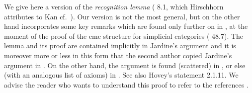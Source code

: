 We give here a version of the {\em recognition lemma}
(\cite{DHK} 8.1, which Hirschhorn attributes to Kan cf.\ \cite{Hirschhorn}). Our
version is not the most general, but on the other hand incorporates some
key remarks which are found only further on in \cite{DHK}, at the
moment of the proof of  the cmc structure for simplicial categories (\cite{DHK}
48.7). The lemma and its proof are contained implicitly
in Jardine's argument \cite{Jardine} and it is moreover
more or less in this form that the second author copied
Jardine's argument in \cite{nCAT}. On the other hand, the argument is found
(scattered) in \cite{JardineGoerssBook}, or else (with
an analogous list of axioms) in \cite{JardineGoerssLoc}. See also
Hovey's statement \cite{HoveyBook} 2.1.11. We advise the reader who
wants to understand this proof to refer to the references
\cite{Hirschhorn} \cite{DHK} \cite{Jardine} \cite{JardineGoerssBook}
\cite{JardineGoerssLoc} \cite{HoveyBook}.

